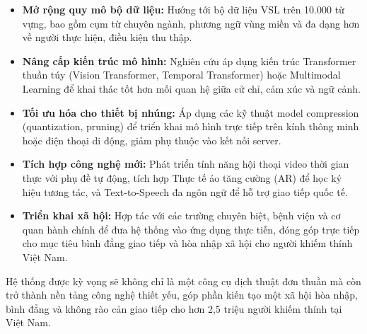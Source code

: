 \begin{itemize}
    \item \textbf{Mở rộng quy mô bộ dữ liệu:} Hướng tới bộ dữ liệu VSL trên 10.000 từ vựng, bao gồm cụm từ chuyên ngành, phương ngữ vùng miền và đa dạng hơn về người thực hiện, điều kiện thu thập.
 
    \item \textbf{Nâng cấp kiến trúc mô hình:} Nghiên cứu áp dụng kiến trúc Transformer thuần túy (Vision Transformer, Temporal Transformer) hoặc Multimodal Learning để khai thác tốt hơn mối quan hệ giữa cử chỉ, cảm xúc và ngữ cảnh.
 
    \item \textbf{Tối ưu hóa cho thiết bị nhúng:} Áp dụng các kỹ thuật model compression (quantization, pruning) để triển khai mô hình trực tiếp trên kính thông minh hoặc điện thoại di động, giảm phụ thuộc vào kết nối server.
 
    \item \textbf{Tích hợp công nghệ mới:} Phát triển tính năng hội thoại video thời gian thực với phụ đề tự động, tích hợp Thực tế ảo tăng cường (AR) để học ký hiệu tương tác, và Text-to-Speech đa ngôn ngữ để hỗ trợ giao tiếp quốc tế.
 
    \item \textbf{Triển khai xã hội:} Hợp tác với các trường chuyên biệt, bệnh viện và cơ quan hành chính để đưa hệ thống vào ứng dụng thực tiễn, đóng góp trực tiếp cho mục tiêu bình đẳng giao tiếp và hòa nhập xã hội cho người khiếm thính Việt Nam.
\end{itemize}
 
Hệ thống được kỳ vọng sẽ không chỉ là một công cụ dịch thuật đơn thuần mà còn trở thành nền tảng công nghệ thiết yếu, góp phần kiến tạo một xã hội hòa nhập, bình đẳng và không rào cản giao tiếp cho hơn 2,5 triệu người khiếm thính tại Việt Nam.
